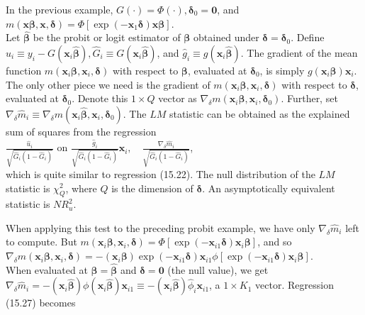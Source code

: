 \documentclass[10pt]{article}
\begin{document}
In the previous example, $G(\cdot)=\Phi(\cdot), \boldsymbol{\delta}_{0}=\mathbf{0}$, and $m(\mathbf{x} \boldsymbol{\beta}, \mathbf{x}, \boldsymbol{\delta})=\Phi\left[\exp \left(-\mathbf{x}_{1} \boldsymbol{\delta}\right) \mathbf{x} \boldsymbol{\beta}\right]$.\\
Let $\hat{\boldsymbol{\beta}}$ be the probit or logit estimator of $\boldsymbol{\beta}$ obtained under $\boldsymbol{\delta}=\boldsymbol{\delta}_{0}$. Define $\hat{u}_{i} \equiv y_{i}-G\left(\mathbf{x}_{i} \hat{\boldsymbol{\beta}}\right), \hat{G}_{i} \equiv G\left(\mathbf{x}_{i} \hat{\boldsymbol{\beta}}\right)$, and $\hat{g}_{i} \equiv g\left(\mathbf{x}_{i} \hat{\boldsymbol{\beta}}\right)$. The gradient of the mean function $m\left(\mathbf{x}_{i} \boldsymbol{\beta}, \mathbf{x}_{i}, \boldsymbol{\delta}\right)$ with respect to $\boldsymbol{\beta}$, evaluated at $\boldsymbol{\delta}_{0}$, is simply $g\left(\mathbf{x}_{i} \boldsymbol{\beta}\right) \mathbf{x}_{i}$. The only other piece we need is the gradient of $m\left(\mathbf{x}_{i} \boldsymbol{\beta}, \mathbf{x}_{i}, \boldsymbol{\delta}\right)$ with respect to $\boldsymbol{\delta}$, evaluated at $\boldsymbol{\delta}_{0}$. Denote this $1 \times Q$ vector as $\nabla_{\delta} m\left(\mathbf{x}_{i} \boldsymbol{\beta}, \mathbf{x}_{i}, \boldsymbol{\delta}_{0}\right)$. Further, set $\nabla_{\delta} \hat{m}_{i} \equiv \nabla_{\delta} m\left(\mathbf{x}_{i} \hat{\boldsymbol{\beta}}, \mathbf{x}_{i}, \boldsymbol{\delta}_{0}\right)$. The $L M$ statistic can be obtained as the explained sum of squares from the regression\\
$\frac{\hat{u}_{i}}{\sqrt{\hat{G}_{i}\left(1-\hat{G}_{i}\right)}}$ on $\frac{\hat{g}_{i}}{\sqrt{\hat{G}_{i}\left(1-\hat{G}_{i}\right)}} \mathbf{x}_{i}, \quad \frac{\nabla_{\delta} \hat{m}_{i}}{\sqrt{\hat{G}_{i}\left(1-\hat{G}_{i}\right)}}$,\\
which is quite similar to regression (15.22). The null distribution of the $L M$ statistic is $\chi_{Q}^{2}$, where $Q$ is the dimension of $\boldsymbol{\delta}$. An asymptotically equivalent statistic is $N R_{u}^{2}$.

When applying this test to the preceding probit example, we have only $\nabla_{\delta} \hat{m}_{i}$ left to compute. But $m\left(\mathbf{x}_{i} \boldsymbol{\beta}, \mathbf{x}_{i}, \boldsymbol{\delta}\right)=\Phi\left[\exp \left(-\mathbf{x}_{i 1} \boldsymbol{\delta}\right) \mathbf{x}_{i} \boldsymbol{\beta}\right]$, and so\\
$\nabla_{\delta} m\left(\mathbf{x}_{i} \boldsymbol{\beta}, \mathbf{x}_{i}, \boldsymbol{\delta}\right)=-\left(\mathbf{x}_{i} \boldsymbol{\beta}\right) \exp \left(-\mathbf{x}_{i 1} \boldsymbol{\delta}\right) \mathbf{x}_{i 1} \phi\left[\exp \left(-\mathbf{x}_{i 1} \boldsymbol{\delta}\right) \mathbf{x}_{i} \boldsymbol{\beta}\right]$.\\
When evaluated at $\boldsymbol{\beta}=\hat{\boldsymbol{\beta}}$ and $\boldsymbol{\delta}=\mathbf{0}$ (the null value), we get $\nabla_{\delta} \hat{m}_{i}=-\left(\mathbf{x}_{i} \hat{\boldsymbol{\beta}}\right) \phi\left(\mathbf{x}_{i} \hat{\boldsymbol{\beta}}\right) \mathbf{x}_{i 1} \equiv-\left(\mathbf{x}_{i} \hat{\boldsymbol{\beta}}\right) \hat{\phi}_{i} \mathbf{x}_{i 1}$, a $1 \times K_{1}$ vector. Regression (15.27) becomes
\end{document}
